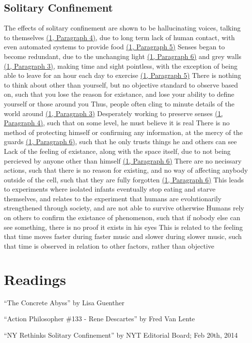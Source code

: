 \documentclass[11 pt, twoside]{article}
\newenvironment{outline*}
{
	\begin{outline}[enumerate]
	}
	{\end{outline}
}
\newcommand{\foota}[2]{\hyperlink{#1}{(#1, Paragraph #2)}}
\begin{document}
\subsection{Solitary Confinement}
\begin{outline*}
\1 The effects of solitary confinement are shown to be hallucinating voices, talking to themselves \foota{1}{4}, due to long term lack of human contact, with even automated systems to provide food \foota{1}{5}
\2 Senses began to become redundant, due to the unchanging light \foota{1}{6} and grey walls \foota{1}{3}, making time and sight pointless, with the exception of being able to leave for an hour each day to exercise \foota{1}{5}
\3 There is nothing to think about other than yourself, but no objective standard to observe based on, such that you lose the reason for existance, and lose your ability to define yourself or those around you
\3 Thus, people often cling to minute details of the world around \foota{1}{3}
\3 Desperately working to preserve senses \foota{1}{4}, such that on some level, he must believe it is real
\2 There is no method of protecting himself or confirming any information, at the mercy of the guards \foota{1}{6}, such that he only trusts things he and others can see
\2 Lack of the feeling of existance, along with the space itself, due to not being percieved by anyone other than himself \foota{1}{6}
\3 There are no necissary actions, such that there is no reason for existing, and no way of affecting anybody outside of the cell, such that they are fully forgotten \foota{1}{6}
\4 This leads to experiments where isolated infants eventually stop eating and starve themselves, and relates to the experiment that humans are evolutionarily strengthened through society, and are not able to survive otherwise
\3 Humans rely on others to confirm the existance of phenomenon, such that if nobody else can see something, there is no proof it exists in his eyes
\1 This is related to the feeling that time moves faster during faster music and slower during slower music, such that time is observed in relation to other factors, rather than objective
\end{outline*}

\section{Readings}
\begin{enumerate}
\hypertarget{1}{\item ``The Concrete Abyss'' by Lisa Guenther}
\hypertarget{2}{\item ``Action Philosopher \#133 - Rene Descartes'' by Fred Van Lente}
\hypertarget{3}{\item ``NY Rethinks Solitary Confinement'' by NYT Editorial Board; Feb 20th, 2014}
\end{enumerate}
\end{document}
